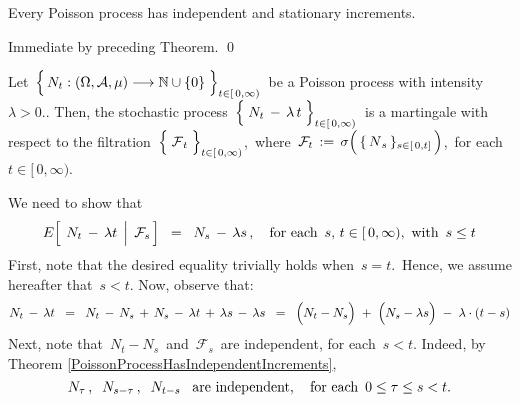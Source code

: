 
\vskip 0.5cm
\begin{corollary}
\mbox{}
\vskip 0.15cm
\noindent
Every Poisson process has independent and stationary increments.
\end{corollary}
\proof
Immediate by preceding Theorem.
\qed


\vskip 1.0cm
\begin{theorem}
\mbox{}
\vskip 0.15cm
\noindent
Let
\,$\left\{\,N_{t} : (\Omega,\mathcal{A},\mu) \overset{{\color{white}-}}{\longrightarrow} \N\cup\{0\} \;\right\}_{t \in [\,0,\infty)}$\,
be a Poisson process with intensity \,$\lambda > 0$..
Then, the stochastic process
\,$\left\{\;N_{t}\,\overset{{\color{white}.}}{-}\,\lambda\,t\;\right\}_{t\in[\,0,\infty)}$\,
is a martingale with respect to the filtration
\,$\left\{\;\overset{{\color{white}.}}{\mathcal{F}}_{t}\;\right\}_{t\in[\,0,\infty)}$,\,
where
\,$\mathcal{F}_{t} \,:=\, \sigma\!\left(\,\{\,\overset{{\color{white}.}}{N}_{s}\,\}_{s\in[\,0,t]}\,\right)$,\,
for each \,$t \in [\,0,\infty)$.
\end{theorem}
\proof
We need to show that
\begin{equation*}
E\!\left[\;\left. N_{t}\,\overset{{\color{white}.}}{-}\,\lambda t\;\,\right\vert\;\mathcal{F}_{s}\,\right]
\;\; = \;\;
	N_{s} \,-\, \lambda s\,,
\quad
\textnormal{for each \,$s,\, t \in [\,0,\infty)$,\, with \,$s \leq t$}
\end{equation*}
First, note that the desired equality trivially holds when \,$s = t$.\,
Hence, we assume hereafter that \,$s < t$.
Now, observe that:
\begin{equation*}
N_{t}\,-\,\lambda t
\;\; = \;\;
	N_{t} \,-\, N_{s} \,+\, N_{s} \,-\, \lambda t \,+\, \lambda s \,-\, \lambda s
\;\; = \;\;
	\left(N_{t} \overset{{\color{white}.}}{-} N_{s}\right)
	\;+\;
	\left(N_{s} \overset{{\color{white}.}}{-} \lambda s\right)
	\;-\;
	\lambda\cdot(t - s)
\end{equation*}
Next, note that \,$N_{t} - N_{s}$\, and \,$\mathcal{F}_{s}$\, are independent, for each \,$s < t$.
Indeed, by Theorem \ref{PoissonProcessHasIndependentIncrements},
\begin{equation*}
N_{\tau}\,,\;\; N_{s-\tau}\,,\;\; N_{t-s}
\;\;\;\textnormal{are independent},
\quad\textnormal{for each \,$0 \leq \tau \leq s < t$}.
\end{equation*}
